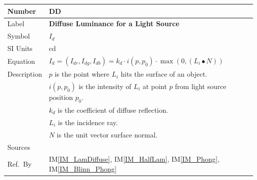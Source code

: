 \documentclass[12pt]{article}
\newcommand{\colAwidth}{0.13\textwidth}
\newcommand{\colBwidth}{0.82\textwidth}
\newcounter{defnum} %
\newcounter{datadefnum} %
\newcommand{\iref}[1]{IM\ref{#1}}
\begin{document}
\noindent
\begin{minipage}{\textwidth}
	\renewcommand*{\arraystretch}{1.5}
	\begin{tabular}{| p{\colAwidth} | p{\colBwidth}|}
		\hline
		\rowcolor[gray]{0.9}
		Number& DD{datadefnum}\thedatadefnum 
		\label{DD_Intensity_diffuse}\\
		\hline
		Label& \bf Diffuse Luminance for a Light Source\\
		\hline
		Symbol &$I_{d}$\\
		\hline
		SI Units & cd\\
		\hline
		Equation&$I_{d} = (I_{dr}, I_{dg}, I_{db})= k_{d}\cdot i(p,p_{0}) \cdot 
		\max(0,(L_{i}\bullet N))$\\
		\hline
		Description & $p$ is the point where $L_{i}$ hits the surface of an 
		object.
		\\
		& $i(p, p_{0})$ is the intensity of $L_{i}$ at point $p$ from light 
		source position $p_{0}$. \\
		& $k_{d}$ is the coefficient of diffuse reflection. \\
		& $L_{i}$ is the incidence ray.\\
		& $N$ is the unit vector surface normal. \\
		\hline
		Sources& \cite{shreiner2012}\\
		\hline
		Ref.\ By & \iref{IM_LamDiffuse}, \iref{IM_HalfLam}, \iref{IM_Phong}, 
		\iref{IM_Blinn_Phong} \\
		\hline
	\end{tabular}
\end{minipage}\\

~\newline
\end{document}
